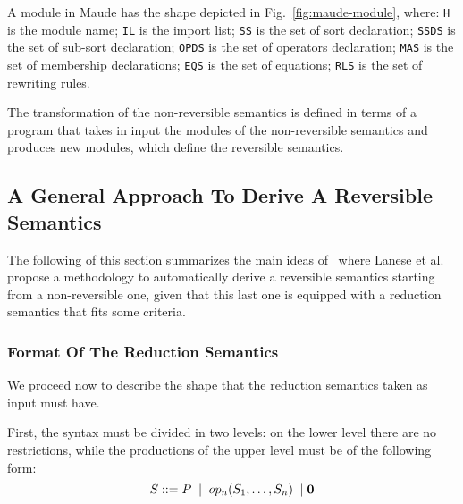 \documentclass{article}[12pt,a4paper]
\theoremstyle{definition}
\newcommand{\paral}{\;|\;}
\begin{document}
A module in Maude has the shape depicted in Fig.~\ref{fig:maude-module}, where:
\verb+H+ is the module name; \verb+IL+ is the import list; \verb+SS+ is the set
of sort declaration; \verb+SSDS+ is the set of sub-sort declaration; \verb+OPDS+
is the set of operators declaration; \verb+MAS+ is the set of membership
declarations; \verb+EQS+ is the set of equations; \verb+RLS+ is the set of
rewriting rules. 

The transformation of the non-reversible semantics is defined in terms of a
program that takes in input the modules of the non-reversible semantics and
produces new modules, which define the reversible semantics.


\subsection{A General Approach To Derive A Reversible Semantics}\label{sec:gener-appr-derive-rev-sem}


The following of this section summarizes the main ideas of~\cite{LaneseM20}
where Lanese et al. propose a methodology to automatically
derive a reversible semantics starting from a non-reversible one, given that
this last one is equipped with a reduction semantics that fits some criteria.

\subsubsection{Format Of The Reduction Semantics}

We proceed now to describe the shape that the reduction semantics taken as input
must have.

First, the syntax must be divided in two levels: on the lower level there are no restrictions,
while the productions of the upper level must be of the following
form:
\[
  S::=P\;\paral \;\op(S_1,\ldots,S_n)\; \paral \nil
\]
\end{document}
